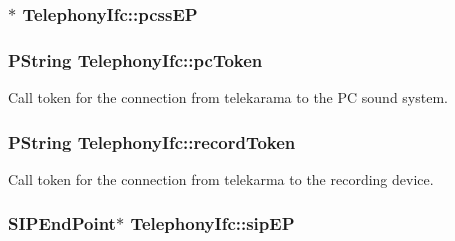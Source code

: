 \hypertarget{classTelephonyIfc_692107ad53586332c50b34ea3b51f76d}{
\subsubsection[{pcssEP}]{$\ast$ {\bf TelephonyIfc::pcssEP}}}
\label{classTelephonyIfc_692107ad53586332c50b34ea3b51f76d}


\hypertarget{classTelephonyIfc_86cd9e4c5ffe313c8aa4b73b02a02a47}{
\subsubsection[{pcToken}]{\setlength{\rightskip}{0pt plus 5cm}PString {\bf TelephonyIfc::pcToken}}}
\label{classTelephonyIfc_86cd9e4c5ffe313c8aa4b73b02a02a47}


Call token for the connection from telekarama to the PC sound system. 

\hypertarget{classTelephonyIfc_616675027eef53f520b9ac96b81a56b0}{
\subsubsection[{recordToken}]{\setlength{\rightskip}{0pt plus 5cm}PString {\bf TelephonyIfc::recordToken}}}
\label{classTelephonyIfc_616675027eef53f520b9ac96b81a56b0}


Call token for the connection from telekarma to the recording device. 

\hypertarget{classTelephonyIfc_67fb79d2bcec4cc072421a5b4c2f4e16}{
\subsubsection[{sipEP}]{\setlength{\rightskip}{0pt plus 5cm}SIPEndPoint$\ast$ {\bf TelephonyIfc::sipEP}}}
\label{classTelephonyIfc_67fb79d2bcec4cc072421a5b4c2f4e16}


